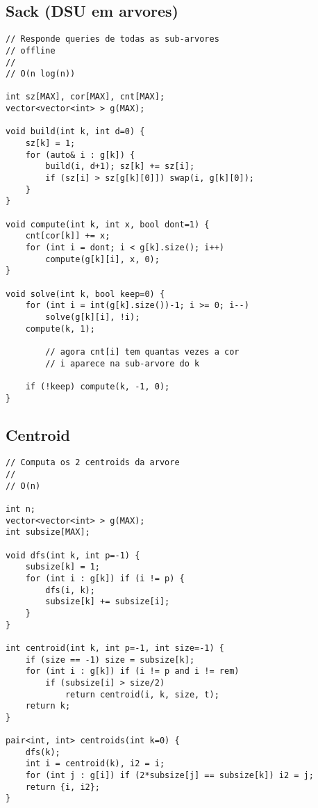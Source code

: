 \documentclass[12pt, a4paper, twoside]{article}
\begin{document}
\subsection{Sack (DSU em arvores)}
\begin{lstlisting}
// Responde queries de todas as sub-arvores
// offline
//
// O(n log(n))

int sz[MAX], cor[MAX], cnt[MAX];
vector<vector<int> > g(MAX);
 
void build(int k, int d=0) {
	sz[k] = 1;
	for (auto& i : g[k]) {
		build(i, d+1); sz[k] += sz[i];
		if (sz[i] > sz[g[k][0]]) swap(i, g[k][0]);
	}
}
 
void compute(int k, int x, bool dont=1) {
	cnt[cor[k]] += x;
	for (int i = dont; i < g[k].size(); i++)
		compute(g[k][i], x, 0);
}
 
void solve(int k, bool keep=0) {
	for (int i = int(g[k].size())-1; i >= 0; i--)
		solve(g[k][i], !i);
	compute(k, 1);
	
        // agora cnt[i] tem quantas vezes a cor
        // i aparece na sub-arvore do k
        
	if (!keep) compute(k, -1, 0);
}
\end{lstlisting}

\subsection{Centroid}
\begin{lstlisting}
// Computa os 2 centroids da arvore
//
// O(n)

int n;
vector<vector<int> > g(MAX);
int subsize[MAX];

void dfs(int k, int p=-1) {
	subsize[k] = 1;
	for (int i : g[k]) if (i != p) {
		dfs(i, k);
		subsize[k] += subsize[i];
	}
}

int centroid(int k, int p=-1, int size=-1) {
	if (size == -1) size = subsize[k];
	for (int i : g[k]) if (i != p and i != rem)
		if (subsize[i] > size/2)
			return centroid(i, k, size, t);
	return k;
}

pair<int, int> centroids(int k=0) {
	dfs(k);
	int i = centroid(k), i2 = i;
	for (int j : g[i]) if (2*subsize[j] == subsize[k]) i2 = j;
	return {i, i2};
}
\end{lstlisting}
\end{document}
